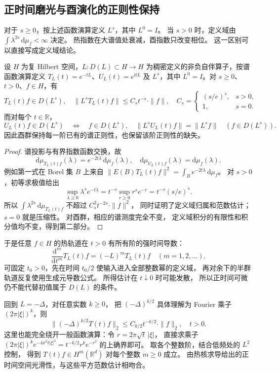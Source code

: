 \subsection{正时间磨光与酉演化的正则性保持}
\label{b2:subsec:D-spectral-smoothing}

对于 \(s\ge0\)，按上述函数演算定义 \(L^s\)，其中 \(L^0=I\)。
当 \(s>0\) 时，定义域由 \(\int\lambda^{2s}\,\mathrm d\mu_f<\infty\) 决定。
热指数在大谱值处衰减，酉指数只改变相位。
这一区别可以直接写成定义域结论。

\begin{proposition}[磨光与定义域不变性]\label{b2:prop:D-spectral-smoothing}
设 \(H\) 为复 Hilbert 空间，\(L:D(L)\subset H\to H\) 为稠密定义的非负自伴算子，按谱函数演算定义 \(T_L(t)=e^{-tL}\)、\(U_L(t)=e^{\mathrm itL}\) 及 \(L^s\)，其中 \(L^0=I\)。对 \(s\ge0\)、\(t>0\)、\(f\in H\)，有
\[
 T_L(t)f\in D(L^s),
 \quad
 \|L^sT_L(t)f\|\le C_s t^{-s}\cdot\|f\|,
 \quad
 C_s=\begin{cases}(s/e)^s,&s>0,\\1,&s=0.\end{cases}
\]
而对每个 \(t\in\mathbb R\)，
\[
 U_L(t)f\in D(L^s)\quad\Longleftrightarrow\quad f\in D(L^s),
 \quad
 \|L^sU_L(t)f\|=\|L^sf\|\quad(f\in D(L^s)).
\]
因此酉群保持每一阶已有的谱正则性，也保留该阶正则性的缺失。
\end{proposition}
\begin{proof}
谱投影与有界指数函数交换，故
\[
 \mathrm d\mu_{T_L(t)f}(\lambda)=e^{-2t\lambda}\,\mathrm d\mu_f(\lambda),
 \quad
 \mathrm d\mu_{U_L(t)f}(\lambda)=\mathrm d\mu_f(\lambda).
\]
例如第一式在 Borel 集 \(B\) 上来自
\(\|E(B)T_L(t)f\|^2=\int_Be^{-2t\lambda}\,\mathrm d\mu_f\)。
对 \(s>0\)，初等求极值给出
\[
 \sup_{\lambda\ge0}\lambda^se^{-t\lambda}
 =t^{-s}\sup_{r\ge0}r^se^{-r}
 =t^{-s}(s/e)^s.
\]
所以 \(\int\lambda^{2s}\,\mathrm d\mu_{T_L(t)f}\)
不超过 \(C_s^2t^{-2s}\cdot\|f\|^2\)，
同时证明了定义域归属和范数估计；\(s=0\) 就是压缩性。
对酉群，相应的谱测度完全不变，
定义域积分的有限性和积分值均不变，得到第二部分。
\end{proof}

于是任意 \(f\in H\) 的热轨道在 \(t>0\) 有所有阶的强时间导数：
\[
 \frac{\mathrm d^m}{\mathrm dt^m}T_L(t)f=(-L)^mT_L(t)f
 \quad(m=1,2,\ldots).
\]
可固定 \(t_0>0\)，先在时间 \(t_0/2\) 使输入进入全部整数幂的定义域，
再对余下的半群轨道反复使用生成元导数公式。
所得估计在 \(t\downarrow0\) 时可能发散，
所以正时间可微仍不能代替初值属于 \(D(L)\) 的条件。

\ProseParagraphBreak
回到 \(L=-\Delta\)，对任意实数 \(k\ge0\)，
把 \((-\Delta)^{k/2}\) 具体理解为 Fourier 乘子 \((2\pi|\xi|)^k\)，则
\begin{equation}\label{b2:eq:D-heat-smoothing}
 \|(-\Delta)^{k/2}T(t)f\|_2
 \le C_{k/2}t^{-k/2}\cdot\|f\|_2,
 \quad t>0.
\end{equation}
这里也能完全绕开一般函数演算：令 \(r=2\pi\sqrt t\,|\xi|\)，
直接求乘子
\((2\pi|\xi|)^ke^{-4\pi^2t|\xi|^2}
=t^{-k/2}r^ke^{-r^2}\) 的上确界即可。
取各个整数阶，结合低频处的 \(L^2\) 控制，
得到 \(T(t)f\in H^m(\mathbb R^d)\) 对每个整数 \(m\ge0\) 成立。
由热核求导给出的正时间空间光滑性，与这些平方范数估计相吻合。

